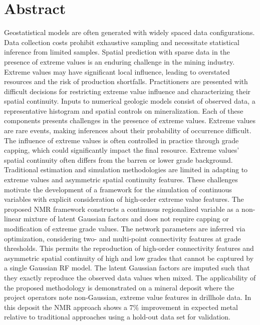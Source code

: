 
\chapter*{Abstract}

\begin{DoubleSpace}
    \linespread{2.0}\selectfont{}

    Geostatistical models are often generated with widely spaced data configurations. Data collection costs prohibit exhaustive sampling and necessitate statistical inference from limited samples. Spatial prediction with sparse data in the presence of extreme values is an enduring challenge in the mining industry. Extreme values may have significant local influence, leading to overstated resources and the risk of production shortfalls. Practitioners are presented with difficult decisions for restricting extreme value influence and characterizing their spatial continuity. Inputs to numerical geologic models consist of observed data, a representative histogram and spatial controls on mineralization. Each of these components presents challenges in the presence of extreme values. Extreme values are rare events, making inferences about their probability of occurrence difficult. The influence of extreme values is often controlled in practice through grade capping, which could significantly impact the final resource. Extreme values' spatial continuity often differs from the barren or lower grade background. Traditional estimation and simulation methodologies are limited in adapting to extreme values and asymmetric spatial continuity features. These challenges motivate the development of a framework for the simulation of continuous variables with explicit consideration of high-order extreme value features. The proposed \acrfull{NMR} framework constructs a continuous regionalized variable as a non-linear mixture of latent Gaussian factors and does not require capping or modification of extreme grade values. The network parameters are inferred via optimization, considering two- and multi-point connectivity features at grade thresholds. This permits the reproduction of high-order connectivity features and asymmetric spatial continuity of high and low grades that cannot be captured by a single Gaussian \gls{RF} model. The latent Gaussian factors are imputed such that they exactly reproduce the observed data values when mixed. The applicability of the proposed methodology is demonstrated on a mineral deposit where the project operators note non-Gaussian, extreme value features in drillhole data. In this deposit the NMR approach shows a 7\% improvement in expected metal relative to traditional approaches using a hold-out data set for validation.


\end{DoubleSpace}
